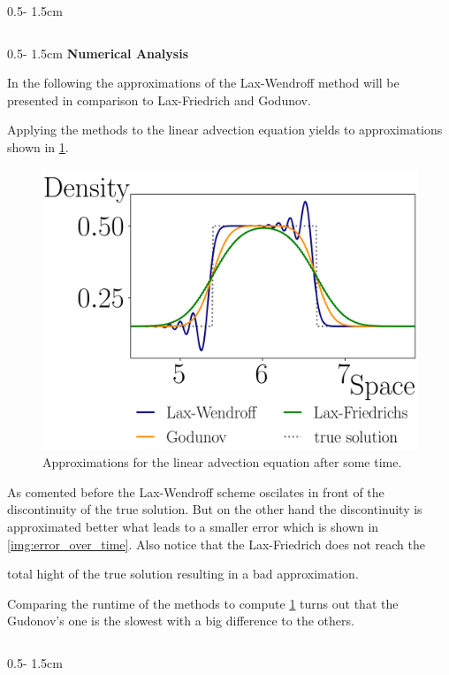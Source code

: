 \documentclass{uibposter}
\begin{document}
\begin{frame}[fragile]
\begin{columns}
\begin{column}{0.5\textwidth - 1.5cm}
\begin{column}{0.5\textwidth - 1.5cm}
\vspace{0.5cm}
\textbf{Numerical Analysis}
\vspace{0.5cm}
    
In the following the approximations of the Lax-Wendroff method will be presented in comparison to Lax-Friedrich and Godunov.

\vspace{0.5cm}
Applying the methods to the linear advection equation yields to approximations shown in \cref{img:linar_comprehension}. 

\begin{figure}[h]
	\includegraphics{fig/linear_compare.png}
	\caption{Approximations for the linear advection equation after some time.}
	\label{img:linar_comprehension}
\end{figure}

As comented before the Lax-Wendroff scheme oscilates in front of the discontinuity of the true solution. But on the other hand the discontinuity is approximated better what leads to a smaller error which is shown in \cref{img:error_over_time}. Also notice that the Lax-Friedrich does not reach the 
 
total hight of the true solution resulting in a bad approximation. 

Comparing the runtime of the methods to compute \cref{img:linar_comprehension} turns out that the Gudonov's one is the slowest with a big difference to the others.

\end{column}
\begin{column}{0.5\textwidth - 1.5cm}
	\vspace*{-1.7cm} 
	

\end{column}
\end{column}
\end{columns}
\end{frame}
\end{document}
